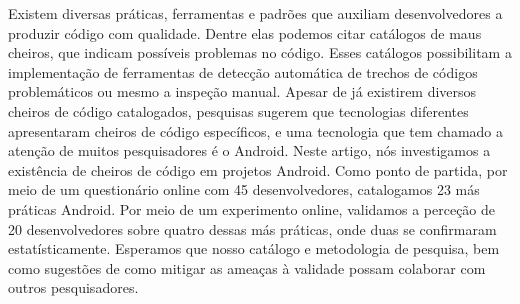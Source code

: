 Existem diversas práticas, ferramentas e padrões que auxiliam desenvolvedores a produzir código com qualidade. Dentre elas podemos citar catálogos de maus cheiros, que indicam possíveis problemas no código. Esses catálogos possibilitam a implementação de ferramentas de detecção automática de trechos de códigos problemáticos ou mesmo a inspeção manual. Apesar de já existirem diversos cheiros de código catalogados, pesquisas sugerem que tecnologias diferentes apresentaram cheiros de código específicos, e uma tecnologia que tem chamado a atenção de muitos pesquisadores é o Android. Neste artigo, nós investigamos a existência de cheiros de código em projetos Android. Como ponto de partida, por meio de um questionário online com 45 desenvolvedores, catalogamos 23 más práticas Android. Por meio de um experimento online, validamos a perceção de 20 desenvolvedores sobre quatro dessas más práticas, onde duas se confirmaram estatísticamente. Esperamos que nosso catálogo e metodologia de pesquisa, bem como sugestões de como mitigar as ameaças à validade possam colaborar com outros pesquisadores.


